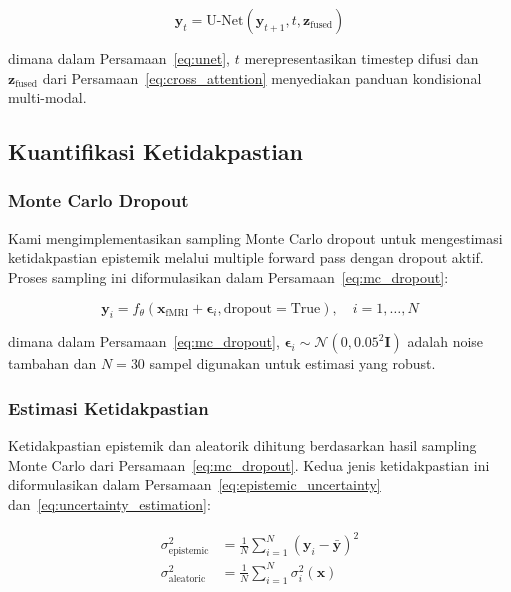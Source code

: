 \begin{equation}
\mathbf{y}_t = \text{U-Net}(\mathbf{y}_{t+1}, t, \mathbf{z}_{\text{fused}})
\label{eq:unet}
\end{equation}

dimana dalam Persamaan~\ref{eq:unet}, $t$ merepresentasikan timestep difusi dan $\mathbf{z}_{\text{fused}}$ dari Persamaan~\ref{eq:cross_attention} menyediakan panduan kondisional multi-modal.

\subsection{Kuantifikasi Ketidakpastian}

\subsubsection{Monte Carlo Dropout}
Kami mengimplementasikan sampling Monte Carlo dropout untuk mengestimasi ketidakpastian epistemik melalui multiple forward pass dengan dropout aktif. Proses sampling ini diformulasikan dalam Persamaan~\ref{eq:mc_dropout}:

\begin{equation}
\mathbf{y}_i = f_{\theta}(\mathbf{x}_{\text{fMRI}} + \boldsymbol{\epsilon}_i, \text{dropout}=\text{True}), \quad i = 1, \ldots, N
\label{eq:mc_dropout}
\end{equation}

dimana dalam Persamaan~\ref{eq:mc_dropout}, $\boldsymbol{\epsilon}_i \sim \mathcal{N}(0, 0.05^2 \mathbf{I})$ adalah noise tambahan dan $N = 30$ sampel digunakan untuk estimasi yang robust.

\subsubsection{Estimasi Ketidakpastian}
Ketidakpastian epistemik dan aleatorik dihitung berdasarkan hasil sampling Monte Carlo dari Persamaan~\ref{eq:mc_dropout}. Kedua jenis ketidakpastian ini diformulasikan dalam Persamaan~\ref{eq:epistemic_uncertainty} dan~\ref{eq:uncertainty_estimation}:

\begin{align}
\sigma_{\text{epistemic}}^2 &= \frac{1}{N} \sum_{i=1}^N (\mathbf{y}_i - \bar{\mathbf{y}})^2 \label{eq:epistemic_uncertainty} \\
\sigma_{\text{aleatoric}}^2 &= \frac{1}{N} \sum_{i=1}^N \sigma_i^2(\mathbf{x}) \label{eq:uncertainty_estimation}
\end{align}

